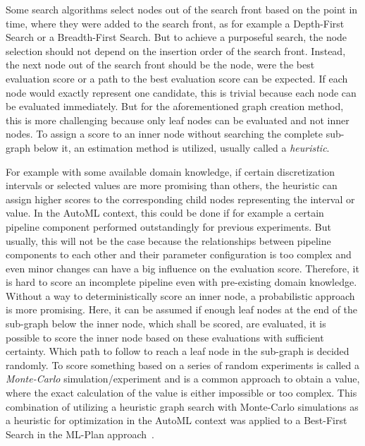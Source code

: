 Some search algorithms select nodes out of the search front  based on the point in time, where they were added to the search front, as for example a Depth-First Search or a Breadth-First Search.
But to achieve a purposeful search, the node selection should not depend on the insertion order of the search front.
Instead, the next node out of the search front should be the node, were the best evaluation score or a path to the best evaluation score can be expected.\newline
If each node would exactly represent one candidate, this is trivial because each node can be evaluated immediately.
But for the aforementioned graph creation method, this is more challenging because only leaf nodes can be evaluated and not inner nodes.
To assign a score to an inner node without searching the complete sub-graph below it, an estimation method is utilized, usually called a \textit{heuristic}.

For example with some available domain knowledge, if certain discretization intervals or selected values are more promising than others, the heuristic can assign higher scores to the corresponding child nodes representing the interval or value.
In the AutoML context, this could be done if for example a certain pipeline component performed outstandingly for previous experiments.
But usually, this will not be the case because the relationships between pipeline components to each other and their parameter configuration is too complex and even minor changes can have a big influence on the evaluation score.
Therefore, it is hard to score an incomplete pipeline even with pre-existing domain knowledge.\newline
Without a way to deterministically score an inner node, a probabilistic approach is more promising.
Here, it can be assumed if enough leaf nodes at the end of the sub-graph below the inner node, which shall be scored, are evaluated, it is possible to score the inner node based on these evaluations with sufficient certainty.
Which path to follow to reach a leaf node in the sub-graph is decided randomly.
To score something based on a series of random experiments is called a \textit{Monte-Carlo} simulation/experiment and is a common approach to obtain a value, where the exact calculation of the value is either impossible or too complex.
This combination of utilizing a heuristic graph search with Monte-Carlo simulations as a heuristic for optimization in the AutoML context was applied to a Best-First Search in the ML-Plan approach~\cite{Mohr-ML-Plan}.

